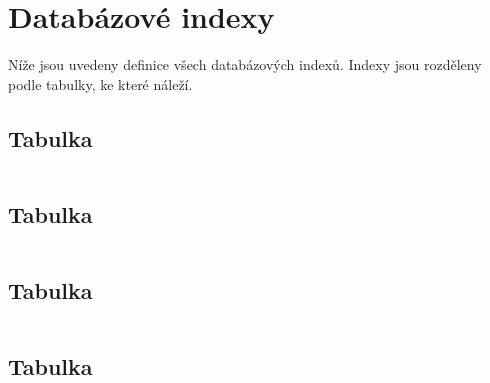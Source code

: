 \section{Databázové indexy}
\label{sec:appendix:sql:indexes}

Níže jsou uvedeny definice všech databázových indexů. Indexy jsou rozděleny podle tabulky, ke které náleží.

\subsection*{Tabulka }
\begin{longlisting}
  \caption[Indexy tabulky issues]{Indexy tabulky }
  \label{lst:appendix:sql:idx_issues}
  \inputminted{sql}{./code/sql/issues_indexes.sql}
\end{longlisting}

\subsection*{Tabulka }
\begin{longlisting}
  \caption[Indexy tabulky issue\_event\_history]{Indexy tabulky }
  \label{lst:appendix:sql:idx_event_history}
  \inputminted{sql}{./code/sql/issue_event_history_indexes.sql}
\end{longlisting}

\subsection*{Tabulka }
\begin{longlisting}
  \caption[Indexy tabulky issue\_labels\_history]{Indexy tabulky }
  \label{lst:appendix:sql:idx_labels_history}
  \inputminted{sql}{./code/sql/issue_labels_history_indexes.sql}
\end{longlisting}

\subsection*{Tabulka }
\begin{longlisting}
  \caption[Indexy tabulky file\_activity]{Indexy tabulky }
  \label{lst:appendix:sql:idx_file_activity}
  \inputminted{sql}{./code/sql/file_activity_indexes.sql}
\end{longlisting}

